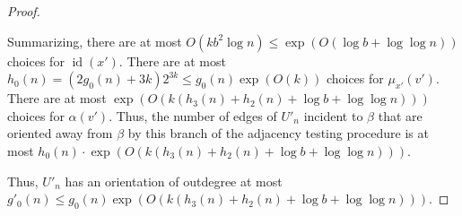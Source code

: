 \documentclass{patmorin}
\renewcommand{\le}{\leqslant}
\DeclareMathOperator{\id}{id}
\newcommand{\torso}[2]{{#1}\langle{#2}\rangle}
\newcommand{\Oh}{O}
\newcommand{\calT}{\mathcal{T}}
\begin{document}
\begin{proof}
\begin{enumerate}
    Summarizing, there are at most $\Oh(k b^2\log n)\le\exp(\Oh(\log b+\log\log n))$ choices for $\id(x')$.  There are at most $h_0(n) = (2g_0(n)+3k)2^{3k} \le g_0(n) \exp(\Oh(k))$ choices for $\mu_{x'}(v')$.  There are at most $\exp(\Oh(k(h_3(n)+h_2(n)+\log b+\log\log n)))$ choices for $\alpha(v')$.  Thus, the number of edges of $U'_n$ incident to $\beta$ that are oriented away from $\beta$ by this branch of the adjacency testing procedure is at most $h_0(n)\cdot \exp(\Oh(k(h_3(n)+h_2(n)+\log b+\log\log n)))$. 
  \end{enumerate}
  Thus, $U'_n$ has an orientation of outdegree at most $g'_0(n)\le g_0(n)\exp(\Oh(k(h_3(n)+h_2(n)+\log b+\log\log n)))$.  
\end{proof}  



\end{document}
